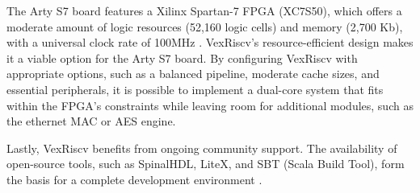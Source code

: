The Arty S7 board features a Xilinx Spartan-7 FPGA (XC7S50), which offers a moderate amount of logic resources (52,160 logic cells) and memory (2,700 Kb), with a universal clock rate of 100MHz \cite{Arty_S7_Schematic}. VexRiscv's resource-efficient design makes it a viable option for the Arty S7 board. By configuring VexRiscv with appropriate options, such as a balanced pipeline, moderate cache sizes, and essential peripherals, it is possible to implement a dual-core system that fits within the FPGA's constraints while leaving room for additional modules, such as the ethernet MAC or AES engine.

Lastly, VexRiscv benefits from ongoing community support. The availability of open-source tools, such as SpinalHDL, LiteX, and SBT (Scala Build Tool), form the basis for a complete development environment \cite{LiteXProject} \cite{SpinalHDL}.
